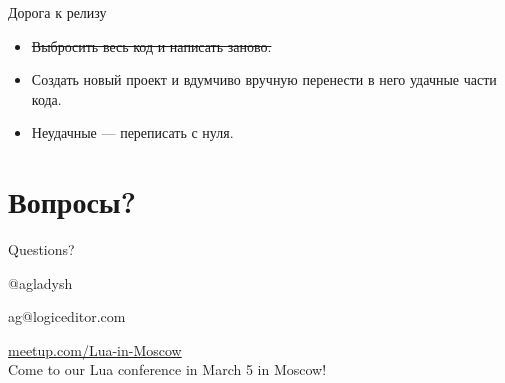\documentclass[aspectratio=169,handout,bigger]{beamer}
\newcommand{\soutt}[1]{%
    \renewcommand{\ULthickness}{1pt}%
       \sout{#1}%
    \renewcommand{\ULthickness}{.4pt}%
}
\begin{document}

\begin{frame}{Дорога к релизу}
  \begin{itemize}
    \item \soutt{Выбросить весь код и написать заново.}
    \item Создать новый проект и вдумчиво вручную
          перенести в него удачные части кода.
    \item Неудачные --- переписать с нуля.
  \end{itemize}
\end{frame}



\section{Вопросы?}

\begin{frame}[plain]{Questions?}

\begin{center}
\Huge{@agladysh}
\end{center}

\begin{center}
\Large{ag@logiceditor.com}
\end{center}

\begin{center}
\href{http://meetup.com/Lua-in-Moscow}{meetup.com/Lua-in-Moscow}
\\
Come to our Lua conference in March 5 in Moscow!
\end{center}

\end{frame}

\end{document}
